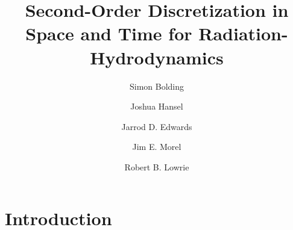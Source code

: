 \documentclass[preprint,12pt]{elsarticle}
\begin{document}
\begin{frontmatter}



\title{Second-Order Discretization in Space and Time for Radiation-Hydrodynamics}


\author[tamu_address]{Simon Bolding}
\author[tamu_address]{Joshua Hansel}
\author[sandia_address]{Jarrod D. Edwards}
\author[tamu_address]{Jim E. Morel}
\author[lanl_address]{Robert B. Lowrie}


\address[tamu_address]{Department of Nuclear Engineering, 337 Zachry Engineering Center, TAMU 3133, Texas A\&M University, College Station, Texas, 77843}
\address[sandia_address]{Phenomenology and Sensor Science Department, Sandia National Laboratory, Albuquerque, NM}
\address[lanl_address]{Computational Physics Group CCS-2, Los Alamos National Laboratory, P.O. Box 1663, MS D413, Los Alamos, NM 87545}

\end{frontmatter}

\section{Introduction}
\end{document}
